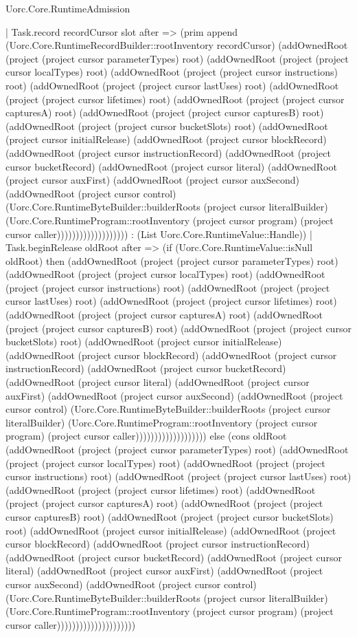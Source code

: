 \begin{lexlean}{Uorc.Core.RuntimeAdmission}
\begin{semanticmodule}
{    | Task.record recordCursor slot after => (prim append (Uorc.Core.RuntimeRecordBuilder::rootInventory recordCursor) (addOwnedRoot (project (project cursor parameterTypes) root) (addOwnedRoot (project (project cursor localTypes) root) (addOwnedRoot (project (project cursor instructions) root) (addOwnedRoot (project (project cursor lastUses) root) (addOwnedRoot (project (project cursor lifetimes) root) (addOwnedRoot (project (project cursor capturesA) root) (addOwnedRoot (project (project cursor capturesB) root) (addOwnedRoot (project (project cursor bucketSlots) root) (addOwnedRoot (project cursor initialRelease) (addOwnedRoot (project cursor blockRecord) (addOwnedRoot (project cursor instructionRecord) (addOwnedRoot (project cursor bucketRecord) (addOwnedRoot (project cursor literal) (addOwnedRoot (project cursor auxFirst) (addOwnedRoot (project cursor auxSecond) (addOwnedRoot (project cursor control) (Uorc.Core.RuntimeByteBuilder::builderRoots (project cursor literalBuilder) (Uorc.Core.RuntimeProgram::rootInventory (project cursor program) (project cursor caller))))))))))))))))))) : (List Uorc.Core.RuntimeValue::Handle))
    | Task.beginRelease oldRoot after => (if (Uorc.Core.RuntimeValue::isNull oldRoot) then (addOwnedRoot (project (project cursor parameterTypes) root) (addOwnedRoot (project (project cursor localTypes) root) (addOwnedRoot (project (project cursor instructions) root) (addOwnedRoot (project (project cursor lastUses) root) (addOwnedRoot (project (project cursor lifetimes) root) (addOwnedRoot (project (project cursor capturesA) root) (addOwnedRoot (project (project cursor capturesB) root) (addOwnedRoot (project (project cursor bucketSlots) root) (addOwnedRoot (project cursor initialRelease) (addOwnedRoot (project cursor blockRecord) (addOwnedRoot (project cursor instructionRecord) (addOwnedRoot (project cursor bucketRecord) (addOwnedRoot (project cursor literal) (addOwnedRoot (project cursor auxFirst) (addOwnedRoot (project cursor auxSecond) (addOwnedRoot (project cursor control) (Uorc.Core.RuntimeByteBuilder::builderRoots (project cursor literalBuilder) (Uorc.Core.RuntimeProgram::rootInventory (project cursor program) (project cursor caller))))))))))))))))))) else (cons oldRoot (addOwnedRoot (project (project cursor parameterTypes) root) (addOwnedRoot (project (project cursor localTypes) root) (addOwnedRoot (project (project cursor instructions) root) (addOwnedRoot (project (project cursor lastUses) root) (addOwnedRoot (project (project cursor lifetimes) root) (addOwnedRoot (project (project cursor capturesA) root) (addOwnedRoot (project (project cursor capturesB) root) (addOwnedRoot (project (project cursor bucketSlots) root) (addOwnedRoot (project cursor initialRelease) (addOwnedRoot (project cursor blockRecord) (addOwnedRoot (project cursor instructionRecord) (addOwnedRoot (project cursor bucketRecord) (addOwnedRoot (project cursor literal) (addOwnedRoot (project cursor auxFirst) (addOwnedRoot (project cursor auxSecond) (addOwnedRoot (project cursor control) (Uorc.Core.RuntimeByteBuilder::builderRoots (project cursor literalBuilder) (Uorc.Core.RuntimeProgram::rootInventory (project cursor program) (project cursor caller)))))))))))))))))))))
}
\end{semanticmodule}
\end{lexlean}
